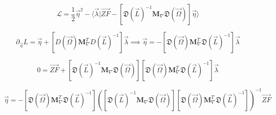 \documentclass[aps,12pt]{revtex4}
\begin{document}
\begin{equation}
	\mathcal L = \dfrac{1}{2} \vec \eta ^2 - \langle \vec \lambda \vert \vec{ZF} - 
	\left[\mathfrak D (\vec L)^{-1} \bm M_\nabla \mathfrak D(\vec\Omega)\right] \vec \eta \rangle
\end{equation}

\begin{equation}
	\partial_{\vec \eta} L = \vec \eta +\left[ D(\vec\Omega) \bm M_\nabla ^T D (\vec L)^{-1} \right] \vec \lambda
	\implies \vec \eta = - \left[ \mathfrak D(\vec\Omega) \bm M_\nabla ^T \mathfrak D (\vec L)^{-1} \right] \vec \lambda
\end{equation}

\begin{equation}
	0 = \vec {ZF} + \left[\mathfrak D (\vec L)^{-1} \bm M_\nabla \mathfrak D(\vec\Omega)\right] 
	\left[ \mathfrak D(\vec\Omega) \bm M_\nabla ^T \mathfrak D (\vec L)^{-1} \right] \vec \lambda
\end{equation}

\begin{equation}
	\vec \eta = - \left[ \mathfrak D(\vec\Omega) \bm M_\nabla ^T \mathfrak D (\vec L)^{-1} \right] \left( \left[\mathfrak D (\vec L)^{-1} \bm M_\nabla \mathfrak D(\vec\Omega)\right] \left[ \mathfrak D(\vec\Omega) \bm M_\nabla ^T \mathfrak D (\vec L)^{-1} \right]\right) ^{-1} \vec{ZF}
\end{equation}
\end{document}
